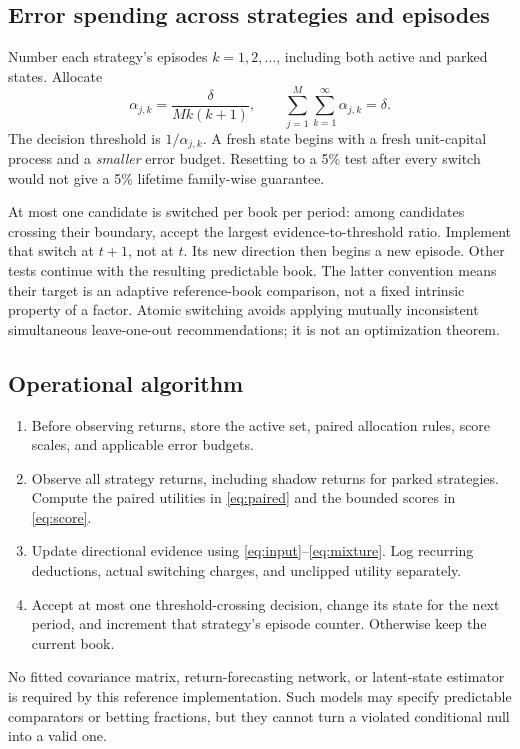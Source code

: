 \subsection{Error spending across strategies and episodes}
Number each strategy's episodes $k=1,2,\ldots$, including both active and parked states. Allocate
\begin{equation}\label{eq:spending}
 \alpha_{j,k}=\frac{\delta}{M k(k+1)},\qquad
 \sum_{j=1}^{M}\sum_{k=1}^{\infty}\alpha_{j,k}=\delta.
\end{equation}
The decision threshold is $1/\alpha_{j,k}$. A fresh state begins with a fresh unit-capital process and a \emph{smaller} error budget. Resetting to a 5\% test after every switch would not give a 5\% lifetime family-wise guarantee.

At most one candidate is switched per book per period: among candidates crossing their boundary, accept the largest evidence-to-threshold ratio. Implement that switch at $t+1$, not at $t$. Its new direction then begins a new episode. Other tests continue with the resulting predictable book. The latter convention means their target is an adaptive reference-book comparison, not a fixed intrinsic property of a factor. Atomic switching avoids applying mutually inconsistent simultaneous leave-one-out recommendations; it is not an optimization theorem.

\subsection{Operational algorithm}
\begin{enumerate}[leftmargin=1.5em,itemsep=1pt]
\item Before observing returns, store the active set, paired allocation rules, score scales, and applicable error budgets.
\item Observe all strategy returns, including shadow returns for parked strategies. Compute the paired utilities in \eqref{eq:paired} and the bounded scores in \eqref{eq:score}.
\item Update directional evidence using \eqref{eq:input}--\eqref{eq:mixture}. Log recurring deductions, actual switching charges, and unclipped utility separately.
\item Accept at most one threshold-crossing decision, change its state for the next period, and increment that strategy's episode counter. Otherwise keep the current book.
\end{enumerate}
No fitted covariance matrix, return-forecasting network, or latent-state estimator is required by this reference implementation. Such models may specify predictable comparators or betting fractions, but they cannot turn a violated conditional null into a valid one.

